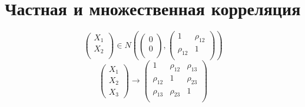\documentclass[a4paper]{article}
\theoremstyle{definition}
\theoremstyle{remark}
\begin{document}
\section*{\centering Частная и множественная корреляция}
\[
    \begin{pmatrix}
    X_1\\
    X_2\\
    
    \end{pmatrix} \in N \left( \begin{pmatrix}
    0\\
    0\\
    
    \end{pmatrix},
    \begin{pmatrix}
    1 & \rho_{12}\\
    \rho_{12} & 1\\
    
    \end{pmatrix}
    \right)
\]
\[
    \begin{pmatrix}
    X_1\\
    X_2\\
    X_3
    
    \end{pmatrix}
    \rightarrow
    \begin{pmatrix}
    1 & \rho_{12} & \rho_{13}\\
    \rho_{12} & 1 & \rho_{23}\\
    \rho_{13} & \rho_{23} & 1\\
    
    \end{pmatrix}
\]
\end{document}

